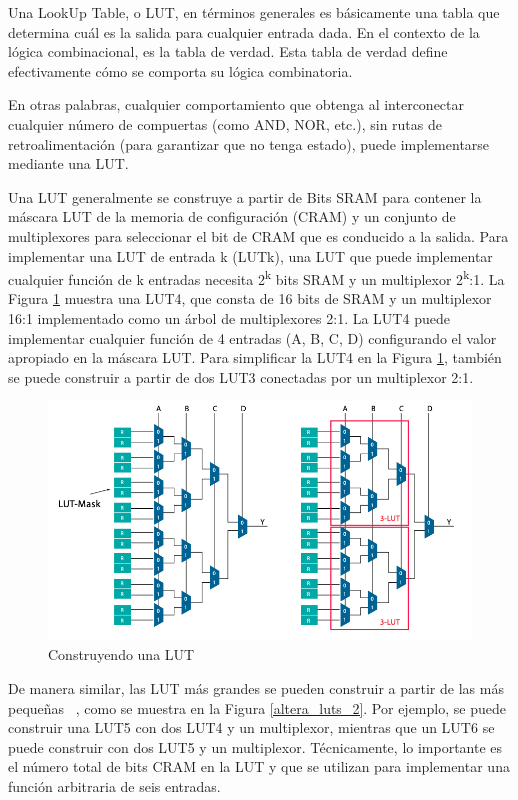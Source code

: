 Una LookUp Table, o LUT, en términos generales es básicamente una tabla que determina cuál es la salida para cualquier entrada dada. En el contexto de la lógica combinacional, es la tabla de verdad. Esta tabla de verdad define efectivamente cómo se comporta su lógica combinatoria.

En otras palabras, cualquier comportamiento que obtenga al interconectar cualquier número de compuertas (como AND, NOR, etc.), sin rutas de retroalimentación (para garantizar que no tenga estado), puede implementarse mediante una LUT.

Una LUT generalmente se construye a partir de Bits SRAM para contener la máscara LUT de la memoria de configuración (CRAM) y un conjunto de multiplexores para seleccionar el bit de CRAM que es conducido a la salida. Para implementar una LUT de entrada k (LUTk), una LUT que puede implementar cualquier función de k entradas necesita 2\textsuperscript{k} bits SRAM y un multiplexor 2\textsuperscript{k}:1. La Figura \ref{altera_luts_1} muestra una LUT4, que consta de 16 bits de SRAM y un multiplexor 16:1 implementado como un árbol de multiplexores 2:1. La LUT4 puede implementar cualquier función de 4 entradas (A, B, C, D) configurando el valor apropiado en la máscara LUT. Para simplificar la LUT4 en la Figura \ref{altera_luts_1}, también se puede construir a partir de dos LUT3 conectadas por un multiplexor 2:1.

\begin{figure}[H]
	\centering
	\includegraphics[width=1 \textwidth]{img/altera_luts_1.png}
	\caption{Construyendo una LUT}
	\label{altera_luts_1}
\end{figure}


De manera similar, las LUT más grandes se pueden construir a partir de las más pequeñas ~\cite{alteraLUTs}, como se muestra en la Figura \ref{altera_luts_2}. Por ejemplo, se puede construir una LUT5 con dos LUT4 y un multiplexor, mientras que un LUT6 se puede construir con dos LUT5 y un multiplexor. Técnicamente, lo importante es el número total de bits CRAM en la LUT y que se utilizan para implementar una función arbitraria de seis entradas.


